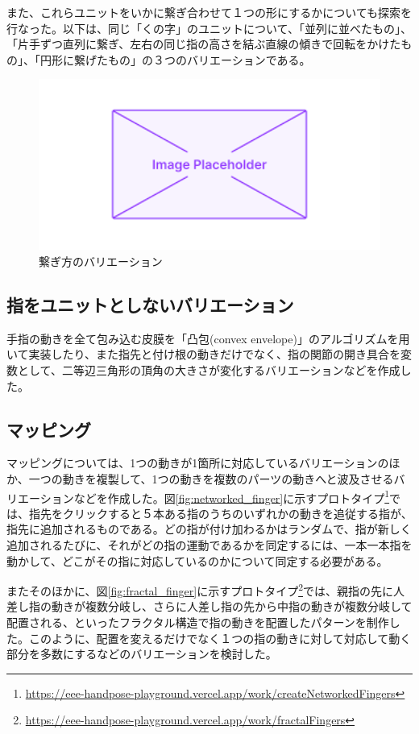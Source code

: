 また、これらユニットをいかに繋ぎ合わせて１つの形にするかについても探索を行なった。以下は、同じ「くの字」のユニットについて、「並列に並べたもの」、「片手ずつ直列に繋ぎ、左右の同じ指の高さを結ぶ直線の傾きで回転をかけたもの」、「円形に繋げたもの」の３つのバリエーションである。

\begin{figure}[H]
  \centering
  \includegraphics[width=15cm]{img/placeholder.png}
  \caption{繋ぎ方のバリエーション}
  \label{fig:connection_valiation}
\end{figure}

\subsection*{指をユニットとしないバリエーション}
手指の動きを全て包み込む皮膜を「凸包(convex envelope)」のアルゴリズムを用いて実装したり、また指先と付け根の動きだけでなく、指の関節の開き具合を変数として、二等辺三角形の頂角の大きさが変化するバリエーションなどを作成した。

\subsection{マッピング}
マッピングについては、1つの動きが1箇所に対応しているバリエーションのほか、一つの動きを複製して、1つの動きを複数のパーツの動きへと波及させるバリエーションなどを作成した。図\ref{fig:networked_finger}に示すプロトタイプ\footnote{\url{https://eee-handpose-playground.vercel.app/work/createNetworkedFingers}}では、指先をクリックすると５本ある指のうちのいずれかの動きを追従する指が、指先に追加されるものである。どの指が付け加わるかはランダムで、指が新しく追加されるたびに、それがどの指の運動であるかを同定するには、一本一本指を動かして、どこがその指に対応しているのかについて同定する必要がある。

またそのほかに、図\ref{fig:fractal_finger}に示すプロトタイプ\footnote{\url{https://eee-handpose-playground.vercel.app/work/fractalFingers}}では、親指の先に人差し指の動きが複数分岐し、さらに人差し指の先から中指の動きが複数分岐して配置される、といったフラクタル構造で指の動きを配置したパターンを制作した。このように、配置を変えるだけでなく１つの指の動きに対して対応して動く部分を多数にするなどのバリエーションを検討した。

